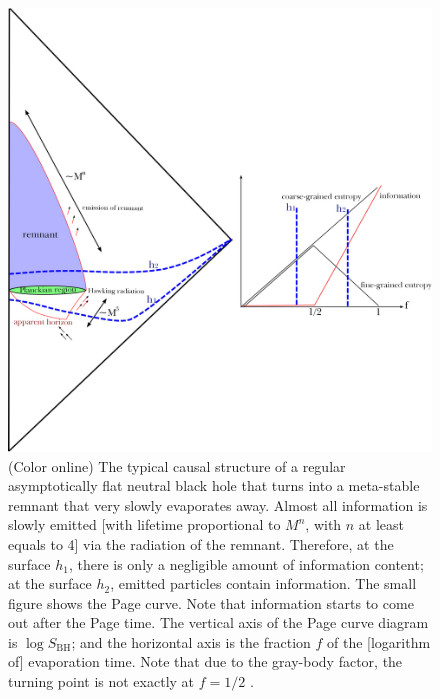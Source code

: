 \documentclass[12pt]{article}
\newcommand{\2}{$^2$}
\newcommand{\3}{$^3$}
\newcommand{\4}{$_4$}
\newcommand{\5}{$_5$}
\begin{document}
\begin{figure}
\begin{center}
\includegraphics[scale=0.45]{regular_remnant-eps-converted-to.pdf}
\caption{\label{fig:regular_remnant}(Color online) The typical causal structure of a regular asymptotically flat neutral black hole that turns into a meta-stable remnant that very slowly evaporates away. Almost all information is slowly emitted [with lifetime proportional to $M^n$, with $n$ at least equals to 4] via the radiation of the remnant. Therefore, at the surface $h_{1}$, there is only a negligible amount of 
information content; at the surface $h_{2}$, emitted particles contain information. The small figure shows the Page curve. Note that information starts to come out after the Page time. The vertical axis of the Page curve diagram is  $\log S_{\text{BH}}$; and the horizontal axis is the fraction $f$ of the [logarithm of] evaporation time. Note that due to the gray-body factor, the turning point is not exactly at $f=1/2$ \cite{page2}.}
\end{center}
\end{figure}
\end{document}
